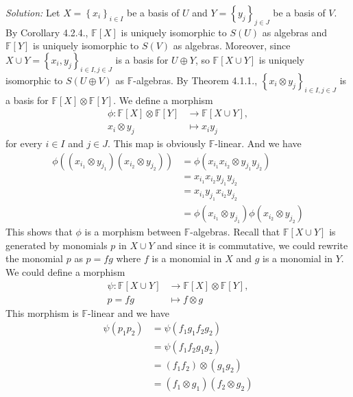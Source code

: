 \documentclass[a4paper, 12pt]{article}
\newenvironment{solution}
    {\textit{Solution:}}
    {}
\begin{document}
\begin{solution}
Let \(X=\left\{ x_i \right\}_{i\in I}\) be a basis of \(U\) and 
\(Y=\left\{ y_j \right\}_{j\in J}\) be a basis of \(V\). By Corollary 4.2.4., \(\mathbb{F}[X]\) is uniquely isomorphic to \(S(U)\) as algebras and \(\mathbb{F}[Y]\) is uniquely isomorphic to \(S(V)\) as algebras. Moreover, 
since \(X\cup Y=\left\{ x_i,y_j \right\}_{i\in I,j\in J}\) is a basis for \(U\oplus Y\), so \(\mathbb{F}[X\cup Y]\) is uniquely isomorphic to \(S(U\oplus V)\) as \(\mathbb{F}\)-algebras. By Theorem 4.1.1., \(\left\{ x_i\otimes y_j \right\}_{i\in I,j\in J}\) is 
a basis for \(\mathbb{F}[X]\otimes \mathbb{F}[Y]\). We define a morphism 
\begin{align*}
	\phi:\mathbb{F}[X]\otimes \mathbb{F}[Y] & \rightarrow \mathbb{F}[X\cup Y],\\ 
	       x_i\otimes y_j &\mapsto x_iy_j
\end{align*}
for every \(i\in I\) and \(j\in J\). This map is obviously \(\mathbb{F}\)-linear. And we have 
\begin{align*}
	\phi((x_{i_1}\otimes y_{j_1})(x_{i_2}\otimes y_{j_2})) & = \phi(x_{i_1}x_{i_2}\otimes y_{j_1}y_{j_2})\\ 
	                                                       & =x_{i_1}x_{i_2}y_{j_1}y_{j_2}\\ 
														   & =x_{i_1}y_{j_1}x_{i_2}y_{j_2}\\ 
														   & =\phi(x_{i_1}\otimes y_{j_1})\phi(x_{i_2}\otimes y_{j_2})
\end{align*}
This shows that \(\phi\) is a morphism between \(\mathbb{F}\)-algebras. 
Recall that \(\mathbb{F}[X\cup Y]\) is generated by monomials \(p\) in \(X\cup Y\) and since it is commutative, we could rewrite the monomial \(p\) as \(p=fg\) where \(f\) is a monomial 
in \(X\) and \(g\) is a monomial in \(Y\). We could define a morphism 
\begin{align*}
	\psi: \mathbb{F}[X\cup Y] & \rightarrow \mathbb{F}[X]\otimes \mathbb{F}[Y],\\ 
	             p=fg&\mapsto f\otimes g
\end{align*}
This morphism is \(\mathbb{F}\)-linear and we have 
\begin{align*}
	\psi(p_1p_2) & =\psi(f_1g_1f_2g_2)\\ 
	             & =\psi(f_1f_2g_1g_2)\\ 
				 & =(f_1f_2)\otimes (g_1g_2)\\ 
				 & =(f_1\otimes g_1)(f_2\otimes g_2)\\ 

\end{align*}
\end{solution}
\end{document}
